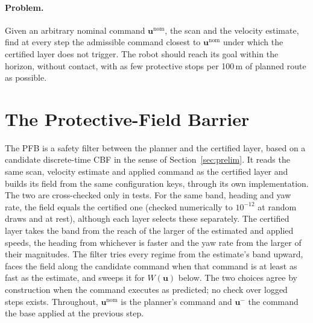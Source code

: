 \documentclass[11pt]{article}
\theoremstyle{definition}
\begin{document}
\paragraph{Problem.} Given an arbitrary nominal command $\mathbf{u}^{\mathrm{nom}}$, the scan and the
velocity estimate, find at every step the admissible command closest to $\mathbf{u}^{\mathrm{nom}}$ under which the certified layer does not trigger. The robot should reach its goal within the horizon, without contact, with as few protective stops per 100\,m of planned route as possible.

\section{The Protective-Field Barrier}\label{sec:pfb}

The PFB is a safety filter between the planner and the certified layer, based on a candidate discrete-time CBF in
the sense of Section~\ref{sec:prelim}. It reads the same scan, velocity estimate and applied command as the
certified layer and builds its field from the same configuration keys, through its own implementation. The two are
cross-checked only in tests. For the same band, heading and yaw rate, the field equals the certified one (checked
numerically to $10^{-12}$ at random draws and at rest), although each layer selects these separately. The certified
layer takes the band from the reach of the larger of the estimated and applied speeds, the heading from whichever is
faster and the yaw rate from the larger of their magnitudes. The filter tries every regime from the estimate's band
upward, faces the field along the candidate command when that command is at least as fast as the estimate, and sweeps
it for $W(\mathbf{u})$ below. The two choices agree by construction when the command executes as predicted; no check
over logged steps exists. Throughout, $\mathbf{u}^{\mathrm{nom}}$ is the planner's command and $\mathbf{u}^-$ the
command the base applied at the previous step.
\end{document}
